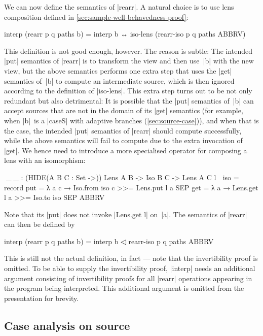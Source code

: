 \documentclass{sigplanconf}
\begin{document}
We can now define the semantics of |rearr|.
A natural choice is to use lens composition defined in \autoref{sec:sample-well-behavedness-proof}:
\begin{code}
interp (rearr p q paths b) =
  interp b ↔ iso-lens (rearr-iso p q paths ABBRV)
\end{code}
This definition is not good enough, however.
The reason is subtle:
The intended |put| semantics of |rearr| is to transform the view and then use~|b| with the new view, but the above semantics performs one extra step that uses the |get| semantics of~|b| to compute an intermediate source, which is then ignored according to the definition of |iso-lens|.
This extra step turns out to be not only redundant but also detrimental: It is possible that the |put| semantics of~|b| can accept sources that are not in the domain of its |get| semantics (for example, when |b|~is a |caseS| with adaptive branches (\autoref{sec:source-case})), and when that is the case, the intended |put| semantics of |rearr| should compute successfully, while the above semantics will fail to compute due to the extra invocation of |get|.
We hence need to introduce a more specialised operator for composing a lens with an isomorphism:
\begin{code}
^^^_◁_ : (HIDE({A B C : Set} ->)) Lens A B -> Iso B C -> Lens A C
l ◁ iso = record
  {    put  = λ a c → Iso.from iso c >>= Lens.put l a
  SEP  get  = λ a → Lens.get l a >>= Iso.to iso SEP ABBRV }
\end{code}
Note that its |put| does not invoke |Lens.get l| on~|a|.
The semantics of |rearr| can then be defined by
\begin{code}
interp (rearr p q paths b) = interp b ◁ rearr-iso p q paths ABBRV
\end{code}
This is still not the actual definition, in fact --- note that the invertibility proof is omitted.
To be able to supply the invertibility proof, |interp| needs an additional argument consisting of invertibility proofs for all |rearr| operations appearing in the program being interpreted.
This additional argument is omitted from the presentation for brevity.

\subsection{Case analysis on source}
\label{sec:source-case}
\end{document}
